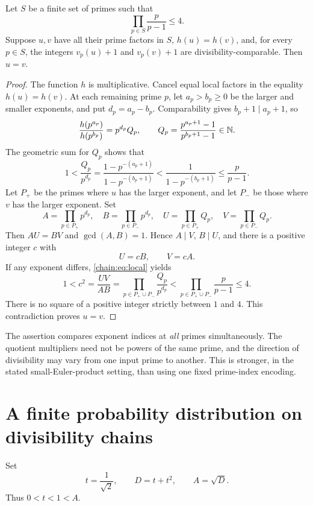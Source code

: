 \begin{lemma}\label{chain:lem:incompatibility}
Let $S$ be a finite set of primes such that
\[
\prod_{p\in S}\frac{p}{p-1}\le4.
\]
Suppose $u,v$ have all their prime factors in $S$, $h(u)=h(v)$, and, for every $p\in S$, the integers $v_p(u)+1$ and $v_p(v)+1$ are divisibility-comparable. Then $u=v$.
\end{lemma}
\begin{proof}
The function $h$ is multiplicative. Cancel equal local factors in the equality $h(u)=h(v)$. At each remaining prime $p$, let $a_p>b_p\ge0$ be the larger and smaller exponents, and put $d_p=a_p-b_p$. Comparability gives $b_p+1\mid a_p+1$, so
\[
\frac{h(p^{a_p})}{h(p^{b_p})}=p^{d_p}Q_p,
\qquad Q_p=\frac{p^{a_p+1}-1}{p^{b_p+1}-1}\in\mathbb N.
\]
The geometric sum for $Q_p$ shows that
\begin{equation}\label{chain:eq:local}
1<\frac{Q_p}{p^{d_p}}
=\frac{1-p^{-(a_p+1)}}{1-p^{-(b_p+1)}}
<\frac1{1-p^{-(b_p+1)}}\le\frac{p}{p-1}.
\end{equation}
Let $P_+$ be the primes where $u$ has the larger exponent, and let $P_-$ be those where $v$ has the larger exponent. Set
\[
A=\prod_{p\in P_+}p^{d_p},\quad B=\prod_{p\in P_-}p^{d_p},
\quad U=\prod_{p\in P_+}Q_p,\quad V=\prod_{p\in P_-}Q_p.
\]
Then $AU=BV$ and $\gcd(A,B)=1$. Hence $A\mid V$, $B\mid U$, and there is a positive integer $c$ with
\[
U=cB,\qquad V=cA.
\]
If any exponent differs, \eqref{chain:eq:local} yields
\[
1<c^2=\frac{UV}{AB}
=\prod_{p\in P_+\cup P_-}\frac{Q_p}{p^{d_p}}
<\prod_{p\in P_+\cup P_-}\frac{p}{p-1}\le4.
\]
There is no square of a positive integer strictly between $1$ and $4$. This contradiction proves $u=v$.
\end{proof}

\begin{remark}
The assertion compares exponent indices at \emph{all} primes simultaneously. The quotient multipliers need not be powers of the same prime, and the direction of divisibility may vary from one input prime to another. This is stronger, in the stated small-Euler-product setting, than using one fixed prime-index encoding.
\end{remark}


\section{A finite probability distribution on divisibility chains}
Set
\[
t=\frac1{\sqrt2},\qquad D=t+t^2,\qquad A=\sqrt D.
\]
Thus $0<t<1<A$.


